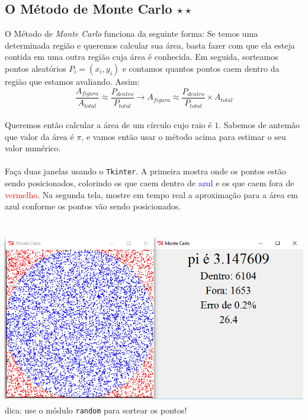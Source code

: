 \documentclass[12pt]{article}
\newcommand{\mono}[1]{\texttt{#1}}
\begin{document}
	\subsection{O Método de Monte Carlo $\star\star$}
	O Método de \emph{Monte Carlo} funciona da seguinte forma: Se temos uma determinada região e queremos calcular sua área, basta fazer com que ela esteja contida em uma outra região cuja área é conhecida. Em seguida, sorteamos pontos aleatórios $P_{i} = (x_{i}, y_{i})$ e contamos quantos pontos caem dentro da região que estamos avaliando. Assim:
	\\
	\[
	\frac{A_{figura}}{A_{total}} \approx \frac{P_{dentro}}{P_{total}} \to A_{figura} \approx \frac{P_{dentro}}{P_{total}} \times A_{total}
	\]
	\\
	Queremos então calcular a área de um círculo cujo raio é $1$. Sabemos de antemão que valor da área é $\pi$, e vamos então usar o método acima para estimar o seu valor numérico.
	\\
	\\
	Faça duas janelas usando o \mono{Tkinter}. A primeira mostra onde os pontos estão sendo posicionados, colorindo os que caem dentro de \textcolor{blue}{azul} e os que caem fora de \textcolor{red}{vermelho}. Na segunda tela, mostre em tempo real a aproximação para a área em azul conforme os pontos vão sendo posicionados. 
	\\
	\\
	\\
	\includegraphics[height=210pt]{monte_carlo.png}
	\\
	dica: use o módulo \mono{random} para sortear os pontos!
	
\end{document}
